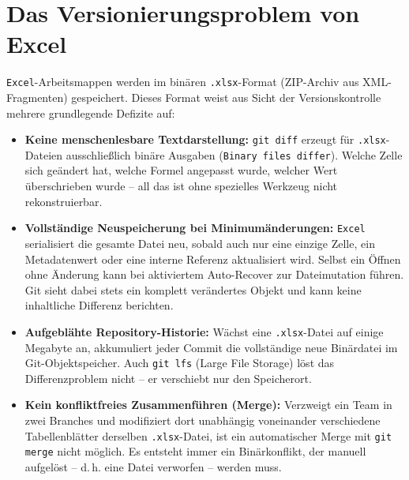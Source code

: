 \documentclass[12pt,a4paper]{report}
\theoremstyle{definition}
\theoremstyle{remark}
\newcommand{\excel}{\texttt{Excel}}
\newcommand{\code}[1]{\texttt{#1}}
\begin{document}
\section{Das Versionierungsproblem von Excel}

\excel-Arbeitsmappen werden im binären \code{.xlsx}-Format (ZIP-Archiv aus
XML-Fragmenten) gespeichert. Dieses Format weist aus Sicht der
Versionskontrolle mehrere grundlegende Defizite auf:

\begin{itemize}[leftmargin=1.5em, itemsep=3pt]
  \item \textbf{Keine menschenlesbare Textdarstellung:}
        \code{git diff} erzeugt für \code{.xlsx}-Dateien ausschließlich
        binäre Ausgaben (\code{Binary files differ}).
        Welche Zelle sich geändert hat, welche Formel angepasst wurde,
        welcher Wert überschrieben wurde -- all das ist ohne spezielles
        Werkzeug nicht rekonstruierbar.

  \item \textbf{Vollständige Neuspeicherung bei Minimumänderungen:}
        \excel{} serialisiert die gesamte Datei neu, sobald auch nur eine
        einzige Zelle, ein Metadatenwert oder eine interne Referenz
        aktualisiert wird. Selbst ein Öffnen ohne Änderung kann bei
        aktiviertem Auto-Recover zur Dateimutation führen. Git sieht
        dabei stets ein komplett verändertes Objekt und kann keine
        inhaltliche Differenz berichten.

  \item \textbf{Aufgeblähte Repository-Historie:}
        Wächst eine \code{.xlsx}-Datei auf einige Megabyte an, akkumuliert
        jeder Commit die vollständige neue Binärdatei im
        Git-Objektspeicher. Auch \code{git lfs} (Large File Storage)
        löst das Differenzproblem nicht -- er verschiebt nur den
        Speicherort.

  \item \textbf{Kein konfliktfreies Zusammenführen (Merge):}
        Verzweigt ein Team in zwei Branches und modifiziert dort
        unabhängig voneinander verschiedene Tabellenblätter derselben
        \code{.xlsx}-Datei, ist ein automatischer Merge mit
        \code{git merge} nicht möglich. Es entsteht immer ein
        Binärkonflikt, der manuell aufgelöst -- d.\,h. eine Datei
        verworfen -- werden muss.


\end{itemize}
\end{document}
